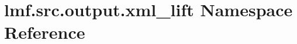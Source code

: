 \hypertarget{namespacelmf_1_1src_1_1output_1_1xml__lift}{\section{lmf.\+src.\+output.\+xml\+\_\+lift Namespace Reference}
\label{namespacelmf_1_1src_1_1output_1_1xml__lift}
}
